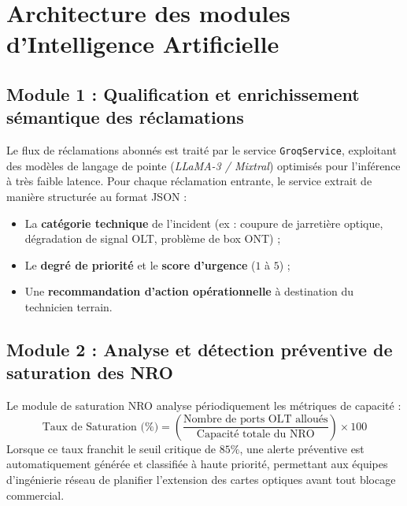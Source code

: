 \section{Architecture des modules d'Intelligence Artificielle}

\subsection{Module 1 : Qualification et enrichissement s\'emantique des r\'eclamations}
Le flux de r\'eclamations abonn\'es est trait\'e par le service \texttt{GroqService}, exploitant des mod\`eles de langage de pointe (\textit{LLaMA-3 / Mixtral}) optimis\'es pour l'inf\'erence \`a tr\`es faible latence. 
Pour chaque r\'eclamation entrante, le service extrait de mani\`ere structur\'ee au format JSON :
\begin{itemize}
    \item La \textbf{cat\'egorie technique} de l'incident (ex : coupure de jarreti\`ere optique, d\'egradation de signal OLT, probl\`eme de box ONT) ;
    \item Le \textbf{degr\'e de priorit\'e} et le \textbf{score d'urgence} ($1$ \`a $5$) ;
    \item Une \textbf{recommandation d'action op\'erationnelle} \`a destination du technicien terrain.
\end{itemize}

\subsection{Module 2 : Analyse et d\'etection pr\'eventive de saturation des NRO}
Le module de saturation NRO analyse p\'eriodiquement les m\'etriques de capacit\'e :
\begin{equation}
\text{Taux de Saturation (\%)} = \left( \frac{\text{Nombre de ports OLT allou\'es}}{\text{Capacit\'e totale du NRO}} \right) \times 100
\end{equation}
Lorsque ce taux franchit le seuil critique de $85\%$, une alerte pr\'eventive est automatiquement g\'en\'er\'ee et classifi\'ee \`a haute priorit\'e, permettant aux \'equipes d'ing\'enierie r\'eseau de planifier l'extension des cartes optiques avant tout blocage commercial.

